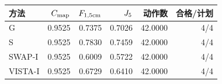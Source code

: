 \begin{tabular}{lrrrrr}
\toprule
方法 & $C_{\mathrm{map}}$ & $F_{1,5\mathrm{cm}}$ & $J_{5}$ & 动作数 & 合格/计划\\\midrule
G & 0.9525 & 0.7375 & 0.7026 & 42.0000 & 4/4 \\
S & 0.9525 & 0.7830 & 0.7459 & 42.0000 & 4/4 \\
SWAP-I & 0.9525 & 0.6009 & 0.5722 & 42.0000 & 4/4 \\
VISTA-I & 0.9525 & 0.6729 & 0.6410 & 42.0000 & 4/4 \\
\bottomrule
\end{tabular}
